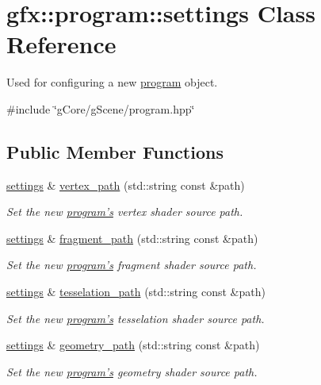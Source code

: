 \hypertarget{classgfx_1_1program_1_1settings}{\section{gfx\-:\-:program\-:\-:settings Class Reference}
\label{classgfx_1_1program_1_1settings}
}


Used for configuring a new \hyperlink{classgfx_1_1program}{program} object.  




{\ttfamily \#include \char`\"{}g\-Core/g\-Scene/program.\-hpp\char`\"{}}

\subsection*{Public Member Functions}
\begin{DoxyCompactItemize}
\item 
\hyperlink{classgfx_1_1program_1_1settings}{settings} \& \hyperlink{classgfx_1_1program_1_1settings_a400e69d84c3200565c5f563f819c6d36}{vertex\-\_\-path} (std\-::string const \&path)
\begin{DoxyCompactList}\small\item\em Set the new \hyperlink{classgfx_1_1program}{program's} vertex shader source path. \end{DoxyCompactList}\item 
\hyperlink{classgfx_1_1program_1_1settings}{settings} \& \hyperlink{classgfx_1_1program_1_1settings_abe3882949187a53035aef3791892c52d}{fragment\-\_\-path} (std\-::string const \&path)
\begin{DoxyCompactList}\small\item\em Set the new \hyperlink{classgfx_1_1program}{program's} fragment shader source path. \end{DoxyCompactList}\item 
\hyperlink{classgfx_1_1program_1_1settings}{settings} \& \hyperlink{classgfx_1_1program_1_1settings_a9022ffbb2cb2e19dd76e10862ad7238f}{tesselation\-\_\-path} (std\-::string const \&path)
\begin{DoxyCompactList}\small\item\em Set the new \hyperlink{classgfx_1_1program}{program's} tesselation shader source path. \end{DoxyCompactList}\item 
\hyperlink{classgfx_1_1program_1_1settings}{settings} \& \hyperlink{classgfx_1_1program_1_1settings_ac14d7007817da228d1f231c839e4654d}{geometry\-\_\-path} (std\-::string const \&path)
\begin{DoxyCompactList}\small\item\em Set the new \hyperlink{classgfx_1_1program}{program's} geometry shader source path. \end{DoxyCompactList}\end{DoxyCompactItemize}
